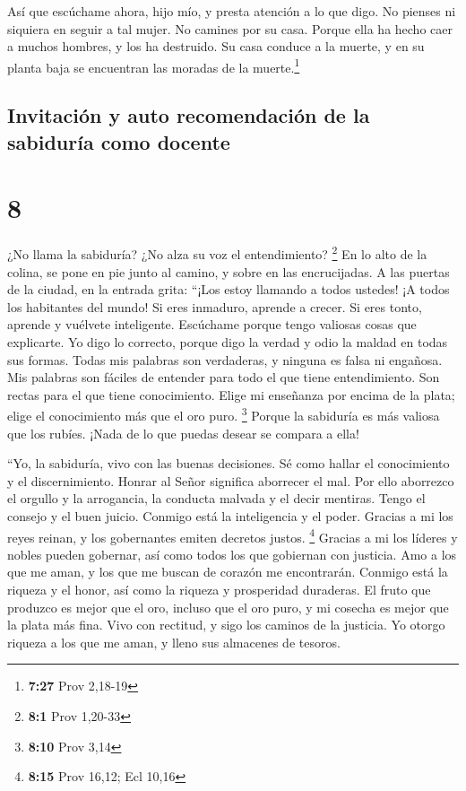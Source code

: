  Así que escúchame ahora, hijo mío, y presta atención a
lo que digo.  No pienses ni siquiera en seguir a tal
mujer. No camines por su casa.  Porque ella ha hecho caer
a muchos hombres, y los ha destruido.  Su casa conduce a
la muerte, y en su planta baja se encuentran las moradas de la
muerte.\footnote{\textbf{7:27} Prov 2,18-19}

\hypertarget{invitaciuxf3n-y-auto-recomendaciuxf3n-de-la-sabiduruxeda-como-docente}{%
\subsection{Invitación y auto recomendación de la sabiduría como
docente}\label{invitaciuxf3n-y-auto-recomendaciuxf3n-de-la-sabiduruxeda-como-docente}}

\hypertarget{section-7}{%
\section{8}\label{section-7}}

 ¿No llama la sabiduría? ¿No alza su voz el entendimiento?
\footnote{\textbf{8:1} Prov 1,20-33}  En lo alto de la
colina, se pone en pie junto al camino, y sobre en las encrucijadas.
 A las puertas de la ciudad, en la entrada grita:
 ``¡Los estoy llamando a todos ustedes! ¡A todos los
habitantes del mundo!  Si eres inmaduro, aprende a crecer.
Si eres tonto, aprende y vuélvete inteligente.  Escúchame
porque tengo valiosas cosas que explicarte.  Yo digo lo
correcto, porque digo la verdad y odio la maldad en todas sus formas.
 Todas mis palabras son verdaderas, y ninguna es falsa ni
engañosa.  Mis palabras son fáciles de entender para todo
el que tiene entendimiento. Son rectas para el que tiene conocimiento.
 Elige mi enseñanza por encima de la plata; elige el
conocimiento más que el oro puro. \footnote{\textbf{8:10} Prov 3,14}
 Porque la sabiduría es más valiosa que los rubíes. ¡Nada
de lo que puedas desear se compara a ella!

 ``Yo, la sabiduría, vivo con las buenas decisiones. Sé
como hallar el conocimiento y el discernimiento.  Honrar
al Señor significa aborrecer el mal. Por ello aborrezco el orgullo y la
arrogancia, la conducta malvada y el decir mentiras. 
Tengo el consejo y el buen juicio. Conmigo está la inteligencia y el
poder.  Gracias a mi los reyes reinan, y los gobernantes
emiten decretos justos. \footnote{\textbf{8:15} Prov 16,12; Ecl 10,16}
 Gracias a mi los líderes y nobles pueden gobernar, así
como todos los que gobiernan con justicia.  Amo a los que
me aman, y los que me buscan de corazón me encontrarán. 
Conmigo está la riqueza y el honor, así como la riqueza y prosperidad
duraderas.  El fruto que produzco es mejor que el oro,
incluso que el oro puro, y mi cosecha es mejor que la plata más fina.
 Vivo con rectitud, y sigo los caminos de la justicia.
 Yo otorgo riqueza a los que me aman, y lleno sus
almacenes de tesoros.

